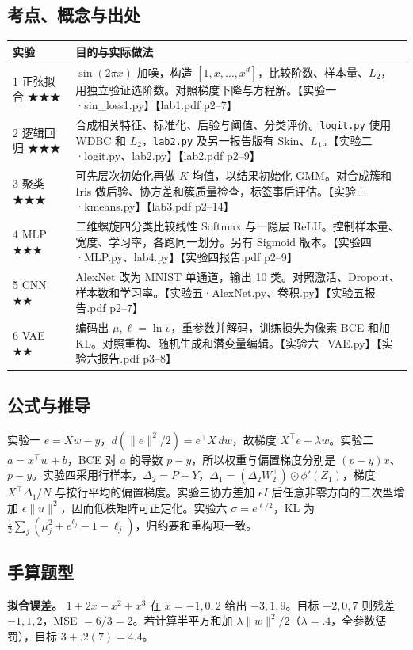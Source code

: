 \documentclass[UTF8,a4paper,zihao=-4,fontset=fandol]{ctexart}
\begin{document}
\subsection{考点、概念与出处}
\begin{tabularx}{\linewidth}{@{}p{.15\linewidth}X@{}}
\toprule
实验 & 目的与实际做法\\
\midrule
1 正弦拟合 ★★★ & $\sin(2\pi x)$ 加噪，构造 $[1,x,\ldots,x^d]$，比较阶数、样本量、$L_2$，用独立验证选阶数。对照梯度下降与方程解。【实验一·sin\_loss1.py】【lab1.pdf p2–7】\\
2 逻辑回归 ★★★ & 合成相关特征、标准化、后验与阈值、分类评价。\texttt{logit.py} 使用 WDBC 和 $L_2$，\texttt{lab2.py} 及另一报告版有 Skin、$L_1$。【实验二·logit.py、lab2.py】【lab2.pdf p2–9】\\
3 聚类 ★★★ & 可先层次初始化再做 $K$ 均值，以结果初始化 GMM。对合成簇和 Iris 做后验、协方差和簇质量检查，标签事后评估。【实验三·kmeans.py】【lab3.pdf p2–14】\\
4 MLP ★★★ & 二维螺旋四分类比较线性 Softmax 与一隐层 ReLU。控制样本量、宽度、学习率，各跑同一划分。另有 Sigmoid 版本。【实验四·MLP.py、lab4.py】【实验四报告.pdf p2–9】\\
5 CNN ★★ & AlexNet 改为 MNIST 单通道，输出 10 类。对照激活、Dropout、样本数和学习率。【实验五·AlexNet.py、卷积.py】【实验五报告.pdf p2–7】\\
6 VAE ★★ & 编码出 $\mu,\ell=\ln v$，重参数并解码，训练损失为像素 BCE 和加 KL。对照重构、随机生成和潜变量编辑。【实验六·VAE.py】【实验六报告.pdf p3–8】\\
\bottomrule
\end{tabularx}

\subsection{公式与推导}
实验一 $e=Xw-y$，$d(\|e\|^2/2)=e^\top X\,dw$，故梯度 $X^\top e+\lambda w$。实验二 $a=x^\top w+b$，BCE 对 $a$ 的导数 $p-y$，所以权重与偏置梯度分别是 $(p-y)x$、$p-y$。实验四采用行样本，$\Delta_2=P-Y$，$\Delta_1=(\Delta_2W_2^\top)\odot\phi'(Z_1)$，梯度 $X^\top\Delta_1/N$ 与按行平均的偏置梯度。实验三协方差加 $\epsilon I$ 后任意非零方向的二次型增加 $\epsilon\|u\|^2$，因而低秩矩阵可正定化。实验六 $\sigma=e^{\ell/2}$，KL 为 $\frac12\sum_j(\mu_j^2+e^{\ell_j}-1-\ell_j)$，归约要和重构项一致。

\subsection{手算题型}
\textbf{拟合误差。} $1+2x-x^2+x^3$ 在 $x=-1,0,2$ 给出 $-3,1,9$。目标 $-2,0,7$ 则残差 $-1,1,2$，MSE $=6/3=2$。若计算半平方和加 $\lambda\|w\|^2/2$（$\lambda=.4$，全参数惩罚），目标 $3+.2(7)=4.4$。
\end{document}
